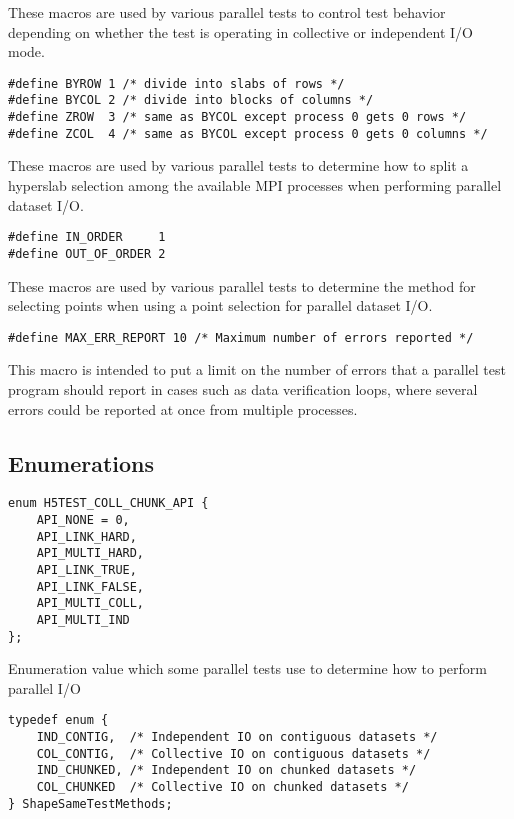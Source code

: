 \documentclass[../HDF5_RFC.tex]{subfiles}
\begin{document}
These macros are used by various parallel tests to control test behavior depending on whether
the test is operating in collective or independent I/O mode.

\begin{verbatim}
#define BYROW 1 /* divide into slabs of rows */
#define BYCOL 2 /* divide into blocks of columns */
#define ZROW  3 /* same as BYCOL except process 0 gets 0 rows */
#define ZCOL  4 /* same as BYCOL except process 0 gets 0 columns */
\end{verbatim}

These macros are used by various parallel tests to determine how to split a hyperslab selection
among the available MPI processes when performing parallel dataset I/O.

\begin{verbatim}
#define IN_ORDER     1
#define OUT_OF_ORDER 2
\end{verbatim}

These macros are used by various parallel tests to determine the method for selecting points
when using a point selection for parallel dataset I/O.

\begin{verbatim}
#define MAX_ERR_REPORT 10 /* Maximum number of errors reported */
\end{verbatim}

This macro is intended to put a limit on the number of errors that a parallel test program
should report in cases such as data verification loops, where several errors could be reported
at once from multiple processes.

\subsection{Enumerations}

\begin{verbatim}
enum H5TEST_COLL_CHUNK_API {
    API_NONE = 0,
    API_LINK_HARD,
    API_MULTI_HARD,
    API_LINK_TRUE,
    API_LINK_FALSE,
    API_MULTI_COLL,
    API_MULTI_IND
};
\end{verbatim}

Enumeration value which some parallel tests use to determine how to perform parallel I/O

\begin{verbatim}
typedef enum {
    IND_CONTIG,  /* Independent IO on contiguous datasets */
    COL_CONTIG,  /* Collective IO on contiguous datasets */
    IND_CHUNKED, /* Independent IO on chunked datasets */
    COL_CHUNKED  /* Collective IO on chunked datasets */
} ShapeSameTestMethods;
\end{verbatim}
\end{document}
